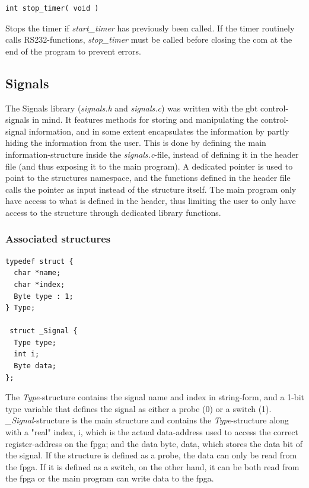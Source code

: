 \documentclass[main.tex]{subfiles}
\begin{document}
\begin{lstlisting}[frame=single] 
int stop_timer( void )
\end{lstlisting}

Stops the timer if \textit{start\_timer} has previously been called. If the timer routinely calls RS232-functions, \textit{stop\_timer} must be called before closing the \gls{com} at the end of the program to prevent errors.

\subsection{Signals}

The Signals library (\textit{signals.h} and \textit{signals.c}) was written with the \gls{gbt} control-signals in mind. It features methods for storing and manipulating the control-signal information, and in some extent encapsulates the information by partly hiding the information from the user. This is done by defining the main information-structure inside the \textit{signals.c}-file, instead of defining it in the header file (and thus exposing it to the main program). A dedicated pointer is used to point to the structures namespace, and the functions defined in the header file calls the pointer as input instead of the structure itself. The main program only have access to what is defined in the header, thus limiting the user to only have access to the structure through dedicated library functions.

\subsubsection{Associated structures}


\begin{lstlisting}[frame=single] 
typedef struct {
  char *name;
  char *index;
  Byte type : 1;
} Type;

 struct _Signal {
  Type type;
  int i; 
  Byte data; 
};
\end{lstlisting}

The \textit{Type}-structure contains the signal name and index in string-form, and a 1-bit type variable that defines the signal as either a probe (0) or a switch (1). \textit{\_Signal}-structure is the main structure and contains the \textit{Type}-structure along with a "real" index, i, which is the actual data-address used to access the correct register-address on the \gls{fpga}; and the data byte, data, which stores the data bit of the signal. If the structure is defined as a probe, the data can only be read from the \gls{fpga}. If it is defined as a switch, on the other hand, it can be both read from the \gls{fpga} or the main program can write data to the \gls{fpga}.
\end{document}
